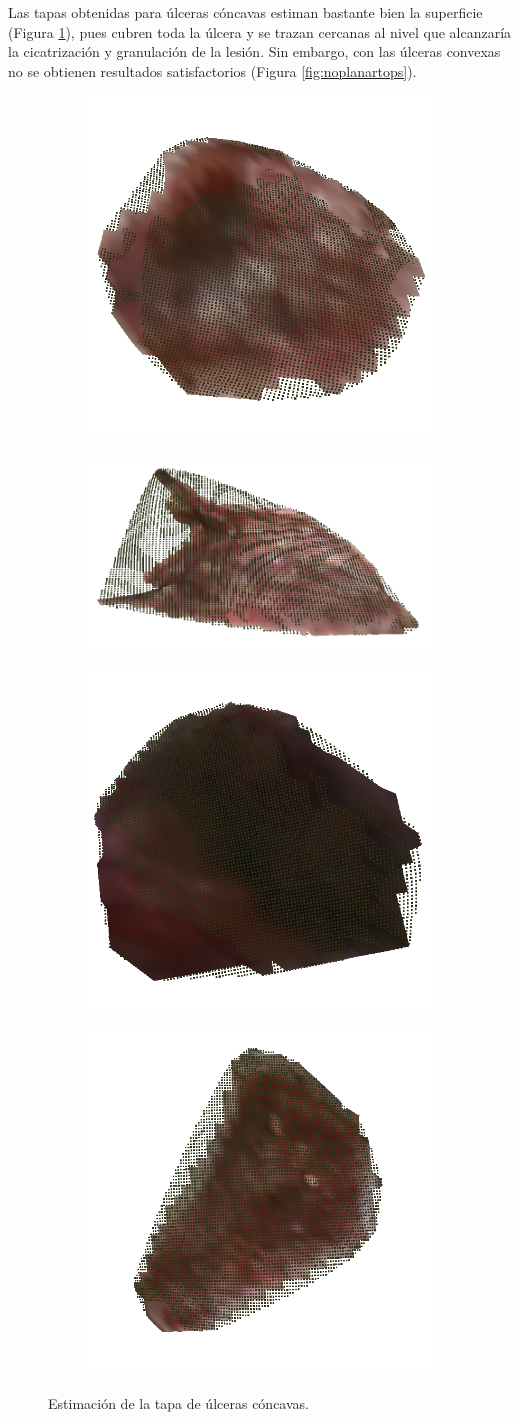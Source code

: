 Las tapas obtenidas para úlceras cóncavas estiman bastante bien la superficie (Figura \ref{fig:planartops}), pues cubren toda la úlcera y se trazan cercanas al nivel que alcanzaría la cicatrización y granulación de la lesión. Sin embargo, con las úlceras convexas no se obtienen resultados satisfactorios (Figura \ref{fig:noplanartops}). 

\begin{figure}[ht]
	\centering
	\begin{subfigure}
		\centering
		\includegraphics[width=.2\linewidth]{./Graphics/planar01.png}
	\end{subfigure}
	\begin{subfigure}
		\centering
		\includegraphics[width=.2\linewidth]{./Graphics/planar03.png}
	\end{subfigure}
	\begin{subfigure}
		\centering
		\includegraphics[width=.2\linewidth]{./Graphics/planar02.png}
	\end{subfigure}
	\begin{subfigure}
		\centering
		\includegraphics[width=.2\linewidth]{./Graphics/planar04.png}
	\end{subfigure}
	\caption{Estimación de la tapa de úlceras cóncavas.}
	\label{fig:planartops}
\end{figure} 

